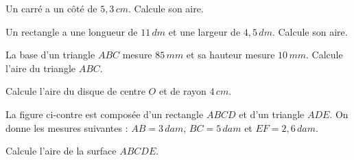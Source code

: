 \begin{pageAD}




 
 Un carré a un côté de $5,3\,cm$. Calcule son aire.
 


 Un rectangle a une longueur de $11\,dm$ et une largeur de $4,5\,dm$. Calcule son aire.
 

 
La base d'un triangle $ABC$ mesure $85\,mm $ et sa hauteur mesure $10\,mm$. Calcule l'aire du triangle $ABC$.


 
 Calcule l'aire du disque de centre $O$ et de rayon $4\,cm$. 
 
\vspace{0.4cm}
 



 

\begin{minipage}{.68\linewidth}
La figure ci-contre est composée d'un rectangle $ABCD$ et d'un triangle $ADE$. On donne les mesures suivantes :
$AB = 3\,dam$, $BC = 5\,dam$ et $EF = 2,6\,dam$.

Calcule l'aire de la surface $ABCDE$.

\end{minipage}
\hfill
\begin{minipage}{.28\linewidth}



\end{minipage}
\end{pageAD}
